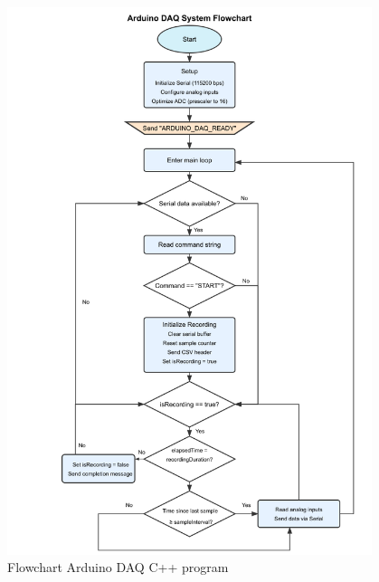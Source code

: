 \begin{figure}[p] %
    \centering
    \includegraphics[width=0.95\textwidth]{chapters/methodology/ArduinoDAQ/flowchart_Arduino_code.png}
    \caption{Flowchart Arduino DAQ C++ program}
    \label{fig:arduinoPseudoCodeFlowchart}
\end{figure}

